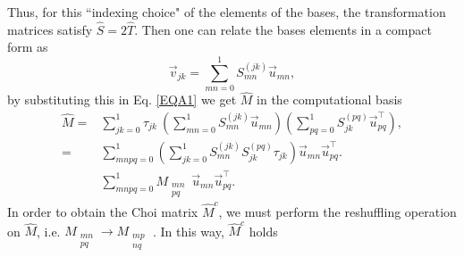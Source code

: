 \documentclass[11pt,dvipsnames]{article} %
\newcommand{\1}{\mathds{1}}
\begin{document}
% 
Thus, for this ``indexing choice" of the elements of the bases, the transformation matrices satisfy $\hat{S}=2\hat{T}$. Then one can relate the bases elements in a compact form as
% 
\begin{equation}
 \vec{v}_{jk}=\sum_{mn=0}^1S_{mn}^{(jk)}\vec{u}_{mn},
\end{equation}
% 
by substituting this in Eq. \ref{EQA1} we get $\hat{M}$ in the computational basis
% 
\begin{align}
 \hat{M}=&\sum_{jk=0}^1\tau_{jk}~\left(\sum_{mn=0}^1S_{mn}^{(jk)}\vec{u}_{mn} \right) \left(\sum_{pq=0}^1S_{jk}^{(pq)}\vec{u}^\intercal_{pq} \right),\\
 =&\sum_{mnpq=0}^1\left(\sum_{jk=0}^1 S_{mn}^{(jk)}S_{jk}^{(pq)}  \tau_{jk} \right) \vec{u}_{mn}\vec{u}^\intercal_{pq}.\\
 &\sum_{mnpq=0}^1 M_{\substack{mn\\pq}} ~\vec{u}_{mn}\vec{u}^\intercal_{pq}.
\end{align}
% 
In order to obtain the Choi matrix $\hat{M}^c$, we must perform the reshuffling operation on $\hat{M}$, i.e. $M_{\substack{mn\\pq}} \to M_{\substack{mp\\nq}}$ \cite{bengtsson_zyczkowski_2017}. In this way, $\hat{M}^c$ holds
\end{document}
